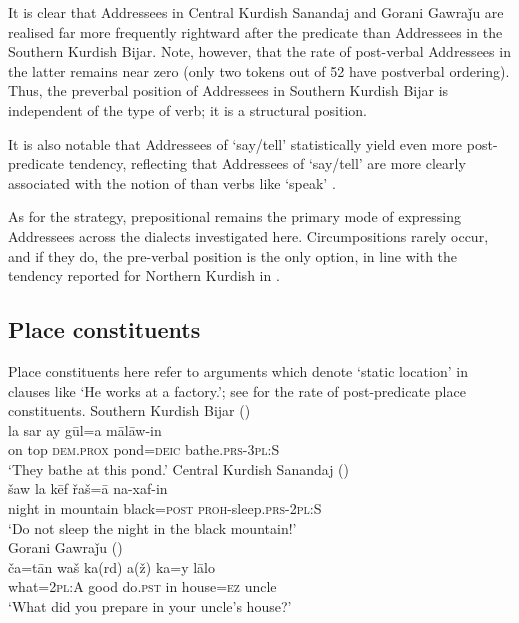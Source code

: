 \documentclass[output=paper,colorlinks,citecolor=brown]{langscibook}
\begin{document}
\begin{sloppypar}
It is clear that Addressees in Central Kurdish Sanandaj and Gorani Gawraǰu are realised far more frequently rightward after the predicate than Addressees in the Southern Kurdish Bijar. Note, however, that the rate of post-verbal Addressees in the latter remains near zero (only two tokens out of 52 have postverbal ordering). Thus, the preverbal position of Addressees in Southern Kurdish Bijar is independent of the type of verb; it is a structural position. 

It is also notable that Addressees of `say/tell' statistically yield even more post-predicate tendency, reflecting that Addressees of `say/tell' are more clearly associated with the notion of  than verbs like `speak' \citep[cf.][359]{Haig2022PostPredicateCon}{}{}. 

As for the  strategy, prepositional  remains the primary mode of expressing Addressees across the dialects investigated here. Circumpositions rarely occur, and if they do, the pre-verbal position is the only option, in line with the tendency reported for Northern Kurdish in \citet{Haig2022PostPredicateCon}. 

\subsection{Place constituents}
Place constituents here refer to arguments which denote `static location' in clauses like `He works at a factory.'; see  for the rate of post-predicate place constituents.
\ea
\ea\label{MGKC:ex:19a}
Southern Kurdish Bijar (\citealt[A, 0079]{mohammadirad_Bijar_Kurdish_2022}) \\
\gll la sar ay gūl=a mālāw-in \\
on top \textsc{dem.prox} pond=\textsc{deic} bathe.\textsc{prs-3pl:S} \\
\glt `They bathe at this pond.'
\ex\label{MGKC:ex:19b}
Central Kurdish Sanandaj (\citealt[A, 0012]{mohammadirad_Sanandaj_Kurdish_2022}) \\
\gll šaw la kēf řaš=ā na-xaf-in \\
night in mountain black=\textsc{post} \textsc{proh}-sleep.\textsc{prs-2pl:S} \\
\glt `Do not sleep the night in the black mountain!' \\
\newpage
\ex\label{MGKC:ex:19c}
Gorani Gawraǰu (\citealt[B, 0352]{mohammadirad_gorani_2022}) \\
\gll ča=tān waš ka(rd) a(ž) ka=y lālo\\
what=\textsc{2pl:A} good do\textsc{.pst} in house=\textsc{ez} uncle \\
\glt `What did you prepare in your uncle's house?'
\z
\z 


\end{sloppypar}
\end{document}

